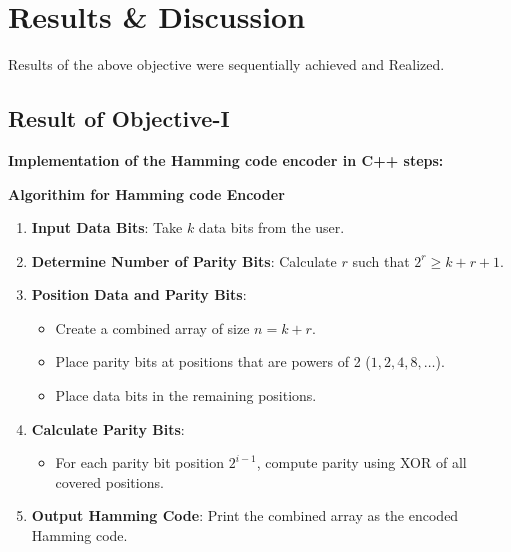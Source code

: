 \documentclass{article}
\numberwithin{equation}{section}
\numberwithin{figure}{section}
\numberwithin{table}{section}
\begin{document}
\pagebreak
\section{\centering Results \& Discussion}
Results of the above objective were sequentially achieved and Realized.
\subsection{Result of Objective-I}
\textbf{Implementation of the Hamming code encoder in C++ steps:}

  


\textbf{Algorithim for Hamming code Encoder}
\begin{enumerate}
    \item \textbf{Input Data Bits}: Take $k$ data bits from the user.
    \item \textbf{Determine Number of Parity Bits}: Calculate $r$ such that $2^r \geq k + r + 1$.
    \item \textbf{Position Data and Parity Bits}:
          \begin{itemize}
              \item Create a combined array of size $n = k + r$.
              \item Place parity bits at positions that are powers of 2 ($1, 2, 4, 8, \ldots$).
              \item Place data bits in the remaining positions.
          \end{itemize}
    \item \textbf{Calculate Parity Bits}:
          \begin{itemize}
              \item For each parity bit position $2^{i-1}$, compute parity using XOR of all covered positions.
          \end{itemize}
    \item \textbf{Output Hamming Code}: Print the combined array as the encoded Hamming code.
\end{enumerate}
\end{document}

